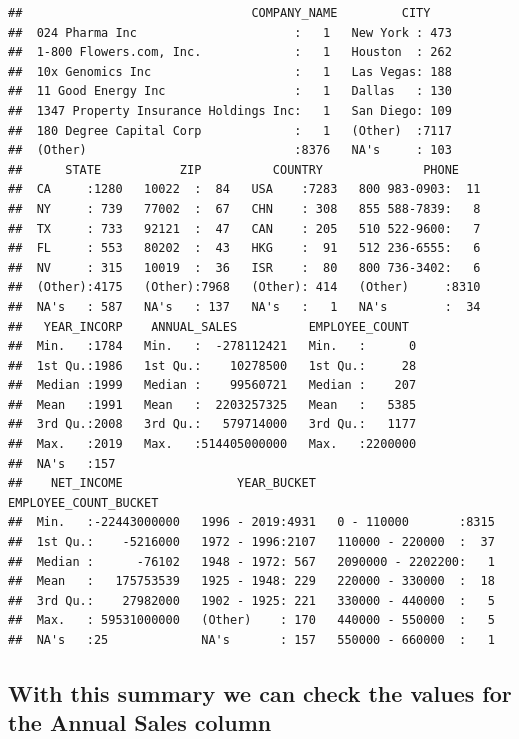 \documentclass[]{article}
\begin{document}
\begin{verbatim}
##                                COMPANY_NAME         CITY     
##  024 Pharma Inc                      :   1   New York : 473  
##  1-800 Flowers.com, Inc.             :   1   Houston  : 262  
##  10x Genomics Inc                    :   1   Las Vegas: 188  
##  11 Good Energy Inc                  :   1   Dallas   : 130  
##  1347 Property Insurance Holdings Inc:   1   San Diego: 109  
##  180 Degree Capital Corp             :   1   (Other)  :7117  
##  (Other)                             :8376   NA's     : 103  
##      STATE           ZIP          COUNTRY              PHONE     
##  CA     :1280   10022  :  84   USA    :7283   800 983-0903:  11  
##  NY     : 739   77002  :  67   CHN    : 308   855 588-7839:   8  
##  TX     : 733   92121  :  47   CAN    : 205   510 522-9600:   7  
##  FL     : 553   80202  :  43   HKG    :  91   512 236-6555:   6  
##  NV     : 315   10019  :  36   ISR    :  80   800 736-3402:   6  
##  (Other):4175   (Other):7968   (Other): 414   (Other)     :8310  
##  NA's   : 587   NA's   : 137   NA's   :   1   NA's        :  34  
##   YEAR_INCORP    ANNUAL_SALES          EMPLOYEE_COUNT   
##  Min.   :1784   Min.   :  -278112421   Min.   :      0  
##  1st Qu.:1986   1st Qu.:    10278500   1st Qu.:     28  
##  Median :1999   Median :    99560721   Median :    207  
##  Mean   :1991   Mean   :  2203257325   Mean   :   5385  
##  3rd Qu.:2008   3rd Qu.:   579714000   3rd Qu.:   1177  
##  Max.   :2019   Max.   :514405000000   Max.   :2200000  
##  NA's   :157                                            
##    NET_INCOME                YEAR_BUCKET         EMPLOYEE_COUNT_BUCKET
##  Min.   :-22443000000   1996 - 2019:4931   0 - 110000       :8315     
##  1st Qu.:    -5216000   1972 - 1996:2107   110000 - 220000  :  37     
##  Median :      -76102   1948 - 1972: 567   2090000 - 2202200:   1     
##  Mean   :   175753539   1925 - 1948: 229   220000 - 330000  :  18     
##  3rd Qu.:    27982000   1902 - 1925: 221   330000 - 440000  :   5     
##  Max.   : 59531000000   (Other)    : 170   440000 - 550000  :   5     
##  NA's   :25             NA's       : 157   550000 - 660000  :   1
\end{verbatim}

\hypertarget{with-this-summary-we-can-check-the-values-for-the-annual-sales-column}{%
\subsection{With this summary we can check the values for the Annual
Sales
column}\label{with-this-summary-we-can-check-the-values-for-the-annual-sales-column}}
\end{document}
